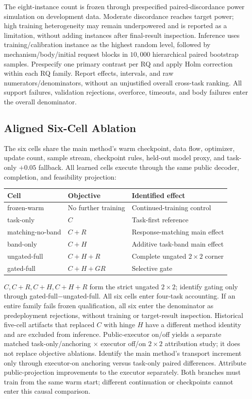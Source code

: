 The eight-instance count is frozen through prespecified paired-discordance power
simulation on development data. Moderate discordance reaches target power; high training
heterogeneity may remain underpowered and is reported as a limitation, without adding
instances after final-result inspection. Inference uses training/calibration instance
as the highest random level, followed by mechanism/body/initial request blocks in
$10{,}000$ hierarchical paired bootstrap samples. Prespecify one primary contrast per
RQ and apply Holm correction within each RQ family. Report effects, intervals, and
raw numerators/denominators, without an unjustified overall cross-task ranking. All
support failures, validation rejections, overforce, timeouts, and body failures enter
the overall denominator.

\subsection{Aligned Six-Cell Ablation}
The six cells share the main method's warm checkpoint, data flow, optimizer, update
count, sample stream, checkpoint rules, held-out model proxy, and task-only $+0.05$
fallback. All learned cells execute through the same public decoder, completion,
and feasibility projection:
\begin{center}
\begin{tabular}{lll}
\toprule
Cell & Objective & Identified effect\\\midrule
frozen-warm & No further training & Continued-training control\\
task-only & $C$ & Task-first reference\\
matching-no-band & $C+R$ & Response-matching main effect\\
band-only & $C+H$ & Additive task-band main effect\\
ungated-full & $C+H+R$ & Complete ungated $2\times2$ corner\\
gated-full & $C+H+GR$ & Selective gate\\
\bottomrule
\end{tabular}
\end{center}
$C,C+R,C+H,C+H+R$ form the strict ungated $2\times2$; identify gating only through
gated-full$-$ungated-full. All six cells enter four-task accounting. If an entire
family fails frozen qualification, all six enter the denominator as predeployment
rejections, without training or target-result inspection. Historical five-cell artifacts
that replaced $C$ with hinge $H$ have a different method identity and are excluded
from inference. Public-executor on/off yields a separate matched task-only/anchoring
$\times$ executor off/on $2\times2$ attribution study; it does not replace objective
ablations. Identify the main method's transport increment only through executor-on
anchoring versus task-only paired differences. Attribute public-projection improvements
to the executor separately. Both branches must train from the same warm start;
different continuation or checkpoints cannot enter this causal comparison.


